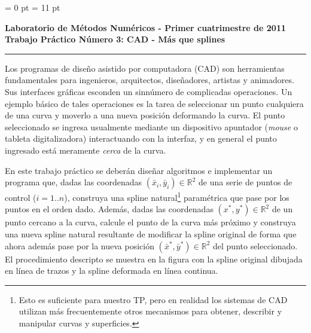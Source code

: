 \parindent = 0 pt
\parskip = 11 pt

\pagestyle{empty}

\newcommand{\real}{\ensuremath{\mathbb{R}}}

%

\begin{centering}
\bf Laboratorio de M\'etodos Num\'ericos - Primer cuatrimestre de 2011 \\
Trabajo Pr\'actico N\'umero 3: CAD - M\'as que splines \\
\end{centering}

\vskip 25pt
\hrule
\vskip 11pt


Los programas de dise\~no asistido por computadora (CAD) son herramientas fundamentales para ingenieros, arquitectos, dise\~nadores, artistas y animadores. Sus interfaces gr\'aficas esconden un sinn\'umero de complicadas operaciones. Un ejemplo b\'asico de tales operaciones es la tarea de seleccionar un punto cualquiera de una curva y moverlo a una nueva posici\'on deformando la curva. El punto seleccionado se ingresa usualmente mediante un dispositivo apuntador (\emph{mouse} o tableta digitalizadora) interactuando con la interfaz, y en general el punto ingresado est\'a meramente \emph{cerca} de la curva.

En este trabajo pr\'actico se deber\'an dise\~nar algoritmos e implementar un programa que, dadas las coordenadas $(\bar{x}_i,\bar{y}_i) \in \real^2$ de una serie de puntos de control ($i = 1..n$), construya una spline natural\footnote{Esto es suficiente para nuestro TP, pero en realidad los sistemas de CAD utilizan m\'as frecuentemente otros mecanismos para obtener, describir y manipular curvas y superficies.} param\'etrica que pase por los puntos en el orden dado. Adem\'as, dadas las coordenadas $(x^*,y^*) \in \real^2$ de un punto cercano a la curva, calcule el punto de la curva m\'as pr\'oximo y construya una nueva spline natural resultante de modificar la spline original de forma que ahora adem\'as pase por la nueva posici\'on $(\bar{x}^*,\bar{y}^*) \in \real^2$ del punto seleccionado. 
El procedimiento descripto se muestra en la figura con la spline original dibujada en l\'inea de trazos y la spline deformada en l\'inea continua.

